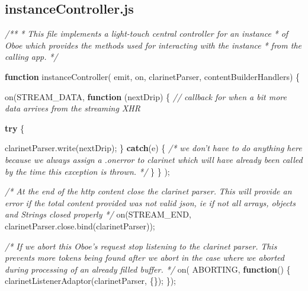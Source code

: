 \documentclass[12pt, ]{article}
\newenvironment{Shaded}{}{}
\newcommand{\KeywordTok}[1]{\textcolor[rgb]{0.00,0.44,0.13}{\textbf{{#1}}}}
\newcommand{\CommentTok}[1]{\textcolor[rgb]{0.38,0.63,0.69}{\textit{{#1}}}}
\newcommand{\OtherTok}[1]{\textcolor[rgb]{0.00,0.44,0.13}{{#1}}}
\newcommand{\FunctionTok}[1]{\textcolor[rgb]{0.02,0.16,0.49}{{#1}}}
\newcommand{\NormalTok}[1]{{#1}}
\begin{document}
\pagebreak

\subsection{instanceController.js}\label{headerux5finstanceController}

\label{src_instanceController}

\begin{Shaded}
\begin{Highlighting}[]
\CommentTok{/**}
\CommentTok{ * This file implements a light-touch central controller for an instance }
\CommentTok{ * of Oboe which provides the methods used for interacting with the instance }
\CommentTok{ * from the calling app.}
\CommentTok{ */}
 
 
\KeywordTok{function} \FunctionTok{instanceController}\NormalTok{(  emit, on, }
                              \NormalTok{clarinetParser, contentBuilderHandlers) \{}
                                
   \FunctionTok{on}\NormalTok{(STREAM_DATA,         }
      \KeywordTok{function} \NormalTok{(nextDrip) \{}
         \CommentTok{// callback for when a bit more data arrives from the streaming XHR         }
          
         \KeywordTok{try} \NormalTok{\{}
            
            \OtherTok{clarinetParser}\NormalTok{.}\FunctionTok{write}\NormalTok{(nextDrip);            }
         \NormalTok{\} }\KeywordTok{catch}\NormalTok{(e) \{ }
            \CommentTok{/* we don't have to do anything here because we always assign}
\CommentTok{               a .onerror to clarinet which will have already been called }
\CommentTok{               by the time this exception is thrown. */}                
         \NormalTok{\}}
      \NormalTok{\}}
   \NormalTok{);}
   
   \CommentTok{/* At the end of the http content close the clarinet parser.}
\CommentTok{      This will provide an error if the total content provided was not }
\CommentTok{      valid json, ie if not all arrays, objects and Strings closed properly */}
   \FunctionTok{on}\NormalTok{(STREAM_END, }\OtherTok{clarinetParser}\NormalTok{.}\OtherTok{close}\NormalTok{.}\FunctionTok{bind}\NormalTok{(clarinetParser));}
   

   \CommentTok{/* If we abort this Oboe's request stop listening to the clarinet parser. }
\CommentTok{      This prevents more tokens being found after we abort in the case where }
\CommentTok{      we aborted during processing of an already filled buffer. */}
   \FunctionTok{on}\NormalTok{( ABORTING, }\KeywordTok{function}\NormalTok{() \{}
      \FunctionTok{clarinetListenerAdaptor}\NormalTok{(clarinetParser, \{\});}
   \NormalTok{\});   }


\end{Highlighting}
\end{Shaded}
\end{document}
